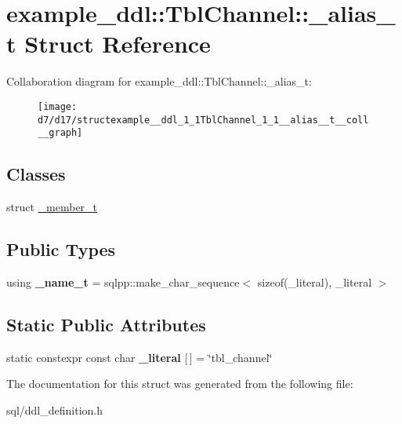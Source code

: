 \hypertarget{structexample__ddl_1_1TblChannel_1_1__alias__t}{}\section{example\+\_\+ddl\+:\+:Tbl\+Channel\+:\+:\+\_\+alias\+\_\+t Struct Reference}
\label{structexample__ddl_1_1TblChannel_1_1__alias__t}


Collaboration diagram for example\+\_\+ddl\+:\+:Tbl\+Channel\+:\+:\+\_\+alias\+\_\+t\+:
\nopagebreak
\begin{figure}[H]
\begin{center}
\leavevmode
\texttt{[image: d7/d17/structexample\_\_ddl\_1\_1TblChannel\_1\_1\_\_alias\_\_t\_\_coll\_\_graph]}
\end{center}
\end{figure}
\subsection*{Classes}
\begin{DoxyCompactItemize}
\item 
struct \hyperlink{structexample__ddl_1_1TblChannel_1_1__alias__t_1_1__member__t}{\+\_\+member\+\_\+t}
\end{DoxyCompactItemize}
\subsection*{Public Types}
\begin{DoxyCompactItemize}
\item 
\hypertarget{structexample__ddl_1_1TblChannel_1_1__alias__t_a9be56241ff9767e9fbb5dd75e08680ed}{}using {\bfseries \+\_\+name\+\_\+t} = sqlpp\+::make\+\_\+char\+\_\+sequence$<$ sizeof(\+\_\+literal), \+\_\+literal $>$\label{structexample__ddl_1_1TblChannel_1_1__alias__t_a9be56241ff9767e9fbb5dd75e08680ed}

\end{DoxyCompactItemize}
\subsection*{Static Public Attributes}
\begin{DoxyCompactItemize}
\item 
\hypertarget{structexample__ddl_1_1TblChannel_1_1__alias__t_a81ab82145eb4239dd0cf1118cbe330fe}{}static constexpr const char {\bfseries \+\_\+literal} \mbox{[}$\,$\mbox{]} = \char`\"{}tbl\+\_\+channel\char`\"{}\label{structexample__ddl_1_1TblChannel_1_1__alias__t_a81ab82145eb4239dd0cf1118cbe330fe}

\end{DoxyCompactItemize}


The documentation for this struct was generated from the following file\+:\begin{DoxyCompactItemize}
\item 
sql/ddl\+\_\+definition.\+h\end{DoxyCompactItemize}
